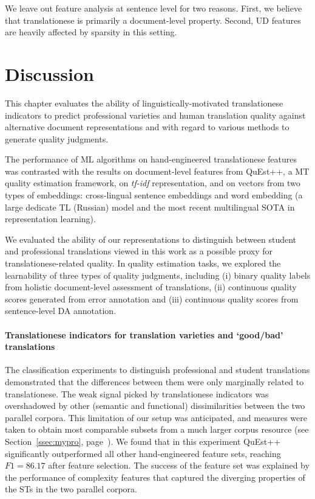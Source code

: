 We leave out feature analysis at sentence level for two reasons. First, we believe that translationese is primarily a document-level property. Second, UD features are heavily affected by sparsity in this setting. 

\section{\label{sec:qua_disc}Discussion}
This chapter evaluates the ability of linguistically-motivated translationese indicators to predict professional varieties and human translation quality against alternative document representations and with regard to various methods to generate quality judgments. 

The performance of ML algorithms on hand-engineered translationese features was contrasted with the results on document-level features from QuEst++, a MT quality estimation framework, on \textit{tf-idf} representation, and on vectors from two types of embeddings: cross-lingual sentence embeddings and word embedding (a large dedicate TL (Russian) model and the most recent multilingual SOTA in representation learning).

We evaluated the ability of our representations to distinguish between student and professional translations viewed in this work as a possible proxy for translationese-related quality.
In quality estimation tasks, we explored the learnability of three types of quality judgments, including (i) binary quality labels from holistic document-level assessment of translations, (ii) continuous quality scores generated from error annotation and (iii) continuous quality scores from sentence-level DA annotation. 

\paragraph{Translationese indicators for translation varieties and `good/bad' translations}  %
The classification experiments to distinguish professional and student translations demonstrated that the differences between them were only marginally related to translationese. The weak signal picked by translationese indicators was overshadowed by other (semantic and functional) dissimilarities between the two parallel corpora. This limitation of our setup was anticipated, and measures were taken to obtain most comparable subsets from a much larger corpus resource (see Section~\ref{ssec:mypro}, page~\pageref{pg:stu_pro_made_comparable}).
We found that in this experiment QuEst++ significantly outperformed all other hand-engineered feature sets, reaching $F1=86.17$ after feature selection. The success of the feature set was explained by the performance of complexity features that captured the diverging properties of the STs in the two parallel corpora. 

